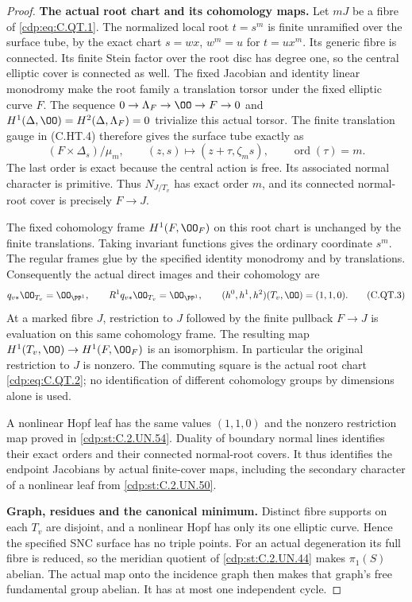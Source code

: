 \begin{proof}
\par\medskip\noindent\textbf{The actual root chart and its cohomology maps.}
Let $mJ$ be a fibre of \eqref{cdp:eq:C.QT.1}. The normalized local root
$t=s^m$ is finite unramified over the surface tube, by
the exact chart $s=wx$, $w^m=u$ for $t=ux^m$.
Its generic fibre is connected. Its finite Stein factor
over the root disc has degree one, so the central
elliptic cover is connected as well. The fixed Jacobian
and identity linear monodromy make the root family a
translation torsor under the fixed elliptic curve $F$.
The sequence $0\to\Lambda_F\to\OO\to F\to0$ and
$H^1(\Delta,\OO)=H^2(\Delta,\Lambda_F)=0$ trivialize
this actual torsor. The finite translation gauge in
(C.HT.4) therefore gives the surface tube exactly as
\[
 (F\times\Delta_s)/\mu_m,
 \qquad(z,s)\longmapsto(z+\tau,\zeta_ms),
 \qquad\operatorname{ord}(\tau)=m.
\tag{C.QT.2}\label{cdp:eq:C.QT.2}
\]
The last order is exact because the central action is
free. Its associated normal character is primitive.
Thus $N_{J/T_v}$ has exact order $m$, and its connected
normal-root cover is precisely $F\to J$.

The fixed cohomology frame $H^1(F,\OO_F)$ on this
root chart is unchanged by the finite translations.
Taking invariant functions gives the ordinary
coordinate $s^m$. The regular frames glue by the
specified identity monodromy and by translations.
Consequently the actual direct images and their
cohomology are
\[
 q_{v*}\OO_{T_v}=\OO_{\PP^1},\qquad
 R^1q_{v*}\OO_{T_v}=\OO_{\PP^1},\qquad
 (h^0,h^1,h^2)(T_v,\OO)=(1,1,0).
\tag{C.QT.3}\label{cdp:eq:C.QT.3}
\]
At a marked fibre $J$, restriction to $J$ followed
by the finite pullback $F\to J$ is evaluation on this
same cohomology frame. The resulting map
$H^1(T_v,\OO)\to H^1(F,\OO_F)$ is an isomorphism.
In particular the original restriction to $J$ is
nonzero. The commuting square is the actual root
chart \eqref{cdp:eq:C.QT.2}; no identification of different
cohomology groups by dimensions alone is used.

A nonlinear Hopf leaf has the same values $(1,1,0)$
and the nonzero restriction map proved in \ref{cdp:st:C.2.UN.54}.
Duality of boundary normal lines identifies their
exact orders and their connected normal-root covers.
It thus identifies the endpoint Jacobians by actual
finite-cover maps, including the secondary character
of a nonlinear leaf from \ref{cdp:st:C.2.UN.50}.

\par\medskip\noindent\textbf{Graph, residues and the canonical minimum.}
Distinct fibre supports on each $T_v$ are disjoint,
and a nonlinear Hopf has only its one elliptic curve.
Hence the specified SNC surface has no triple points.
For an actual degeneration its full fibre is reduced,
so the meridian quotient of \ref{cdp:st:C.2.UN.44} makes $\pi_1(S)$
abelian. The actual map onto the incidence graph
then makes that graph's free fundamental group
abelian. It has at most one independent cycle.


\end{proof}
